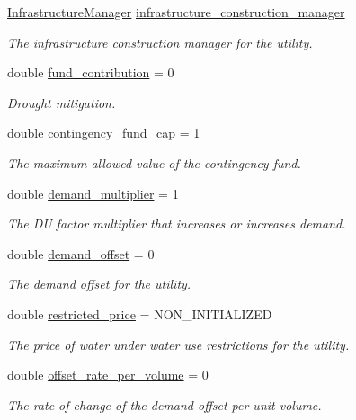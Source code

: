 \begin{DoxyCompactItemize}
\mbox{\hyperlink{classInfrastructureManager}{Infrastructure\+Manager}} \mbox{\hyperlink{classUtility_a2eff94831dd7a4b7a4243ef69c5311d9}{infrastructure\+\_\+construction\+\_\+manager}}
\begin{DoxyCompactList}\small\item\em The infrastructure construction manager for the utility. \end{DoxyCompactList}\item 
double \mbox{\hyperlink{classUtility_ae2dae3ed65967f89675218c3b55ef9f1}{fund\+\_\+contribution}} = 0
\begin{DoxyCompactList}\small\item\em Drought mitigation. \end{DoxyCompactList}\item 
double \mbox{\hyperlink{classUtility_acad95d9c3155e6079281f3afefe03359}{contingency\+\_\+fund\+\_\+cap}} = 1
\begin{DoxyCompactList}\small\item\em The maximum allowed value of the contingency fund. \end{DoxyCompactList}\item 
double \mbox{\hyperlink{classUtility_ad1de23b261a8a1b6db86651d48b7abcd}{demand\+\_\+multiplier}} = 1
\begin{DoxyCompactList}\small\item\em The DU factor multiplier that increases or increases demand. \end{DoxyCompactList}\item 
double \mbox{\hyperlink{classUtility_ab6711489e4242a1871a8ed80066920eb}{demand\+\_\+offset}} = 0
\begin{DoxyCompactList}\small\item\em The demand offset for the utility. \end{DoxyCompactList}\item 
double \mbox{\hyperlink{classUtility_ad8c81bed9c3f3978a669f1259845b228}{restricted\+\_\+price}} = N\+O\+N\+\_\+\+I\+N\+I\+T\+I\+A\+L\+I\+Z\+ED
\begin{DoxyCompactList}\small\item\em The price of water under water use restrictions for the utility. \end{DoxyCompactList}\item 
double \mbox{\hyperlink{classUtility_a82c8cf50e20ab43c6b99d602b3d5d3c8}{offset\+\_\+rate\+\_\+per\+\_\+volume}} = 0
\begin{DoxyCompactList}\small\item\em The rate of change of the demand offset per unit volume. \end{DoxyCompactList}\item 

\end{DoxyCompactItemize}
